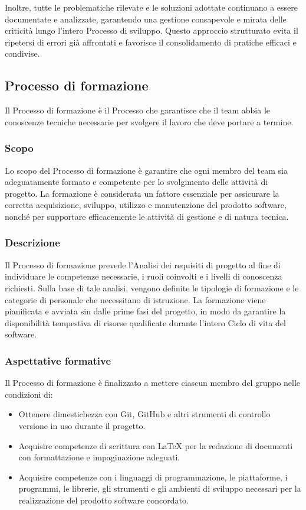 \documentclass[a4paper,12pt]{article}
\begin{document}
Inoltre, tutte le problematiche rilevate e le soluzioni adottate continuano a essere documentate e analizzate, garantendo una gestione consapevole e mirata delle criticità lungo l’intero Processo di sviluppo. Questo approccio strutturato evita il ripetersi di errori già affrontati e favorisce il consolidamento di pratiche efficaci e condivise.

\subsection{Processo di formazione} \label{sec:processo-formazione}
Il Processo di formazione è il Processo che garantisce che il team abbia le conoscenze tecniche necessarie per svolgere il lavoro che deve portare a termine.

\subsubsection{Scopo}
Lo scopo del Processo di formazione è garantire che ogni membro del team sia adeguatamente formato e competente per lo svolgimento delle attività di progetto. La formazione è considerata un fattore essenziale per assicurare la corretta acquisizione, sviluppo, utilizzo e manutenzione del prodotto software, nonché per supportare efficacemente le attività di gestione e di natura tecnica.

\subsubsection{Descrizione}
Il Processo di formazione prevede l’Analisi dei requisiti di progetto al fine di individuare le competenze necessarie, i ruoli coinvolti e i livelli di conoscenza richiesti. Sulla base di tale analisi, vengono definite le tipologie di formazione e le categorie di personale che necessitano di istruzione. La formazione viene pianificata e avviata sin dalle prime fasi del progetto, in modo da garantire la disponibilità tempestiva di risorse qualificate durante l’intero Ciclo di vita del software.
\subsubsection{Aspettative formative}
Il Processo di formazione è finalizzato a mettere ciascun membro del gruppo nelle condizioni di:
\begin{itemize}
\item Ottenere dimestichezza con Git, GitHub e altri strumenti di controllo versione in uso durante il progetto.
\item Acquisire competenze di scrittura con \LaTeX{} per la redazione di documenti con formattazione e impaginazione adeguati.
\item Acquisire competenze con i linguaggi di programmazione, le piattaforme, i programmi, le librerie, gli strumenti e gli ambienti di sviluppo necessari per la realizzazione del prodotto software concordato.
\end{itemize}
\end{document}
